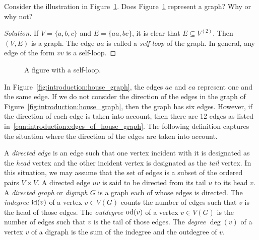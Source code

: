 \begin{example}
Consider the illustration in
Figure~\ref{fig:introduction:self_loop}. Does
Figure~\ref{fig:introduction:self_loop} represent a graph? Why or why
not?
\end{example}

\begin{proof}[Solution]
If $V = \{ a, b, c \}$ and $E = \{ aa, bc \}$, it is clear that $E
\subseteq V^{(2)}$. Then $(V, E)$ is a graph. The edge $aa$ is
called a \emph{self-loop} of the graph. In general,
any edge of the form $vv$ is a self-loop.
\end{proof}

\begin{figure}[!htbp]
\centering

\caption{A figure with a self-loop.}
\label{fig:introduction:self_loop}
\end{figure}

In Figure~\ref{fig:introduction:house_graph}, the edges $ae$ and $ea$
represent one and the same edge. If we do not consider the direction
of the edges in the graph of
Figure~\ref{fig:introduction:house_graph}, then the graph has six
edges. However, if the direction of each edge is taken into account,
then there are 12 edges as listed
in~\eqref{eqn:introduction:edges_of_house_graph}. The following
definition captures the situation where the direction of the edges are
taken into account.

A \emph{directed edge} is an edge such that one
vertex incident with it is designated as the
\emph{head} vertex and the other incident vertex is
designated as the \emph{tail} vertex. In this
situation, we may assume that the set of edges is a subset of the
ordered pairs $V \times V$. A directed edge $uv$ is said to be
directed from its tail $u$ to its head $v$. A
\emph{directed graph} or
\emph{digraph} $G$ is a graph each of whose edges is
directed. The \emph{indegree} $\operatorname*{id}(v)$\index{$\id$} of
a vertex $v \in V(G)$ counts the number of edges such that $v$ is the
head of those edges. The \emph{outdegree}
$\operatorname*{od}(v)$\index{$\od$} of a vertex $v \in V(G)$ is the number of edges
such that $v$ is the tail of those edges. The
\emph{degree} $\deg(v)$\index{$\deg$} of a vertex $v$ of
a digraph is the sum of the indegree and the outdegree of $v$.

